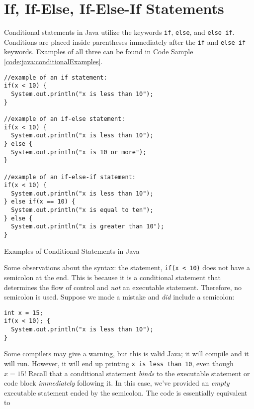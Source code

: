 \section{If, If-Else, If-Else-If Statements}

Conditional statements in Java utilize the keywords \texttt{if}, \texttt{else}, and
\texttt{else if}.  Conditions are placed inside parentheses immediately after the 
\texttt{if} and \texttt{else if} keywords.  Examples of all three can be 
found in Code Sample \ref{code:java:conditionalExamples}.

\begin{listing}
\begin{verbatim}
//example of an if statement:
if(x < 10) {
  System.out.println("x is less than 10");
}

//example of an if-else statement:
if(x < 10) {
  System.out.println("x is less than 10");
} else {
  System.out.println("x is 10 or more");
}

//example of an if-else-if statement:
if(x < 10) {
  System.out.println("x is less than 10");
} else if(x == 10) {
  System.out.println("x is equal to ten");
} else {
  System.out.println("x is greater than 10");
}
\end{verbatim}
\caption{Examples of Conditional Statements in Java}
\label{code:java:conditionalExamples}
\end{listing}

Some observations about the syntax: the statement, \texttt{if(x < 10)}
does not have a semicolon at the end.  This is because it is a conditional statement
that determines the flow of control and \emph{not} an executable statement.  
Therefore, no semicolon is used.  Suppose we made a mistake and \emph{did}
include a semicolon:

\begin{verbatim}
int x = 15;
if(x < 10); {
  System.out.println("x is less than 10");
}
\end{verbatim}

Some compilers may give a warning, but this is valid Java; it will compile and it 
will run.  However, it will end up printing \texttt{x is less than 10}, even
though $x = 15$!  Recall that a conditional statement \emph{binds} to the 
executable statement or code block \emph{immediately} following it.  In this
case, we've provided an \emph{empty} executable statement ended by the
semicolon.  The code is essentially equivalent to 

